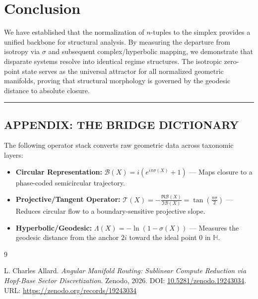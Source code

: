 \documentclass[12pt]{article}
\begin{document}
\section{Conclusion}
We have established that the normalization of $n$-tuples to the simplex provides a unified backbone for structural analysis. By measuring the departure from isotropy via $\sigma$ and subsequent complex/hyperbolic mapping, we demonstrate that disparate systems resolve into identical regime structures. The isotropic zero-point state serves as the universal attractor for all normalized geometric manifolds, proving that structural morphology is governed by the geodesic distance to absolute closure.

\vspace{1em}
\noindent\rule{\textwidth}{0.4pt}

\subsection*{APPENDIX: THE BRIDGE DICTIONARY}
The following operator stack converts raw geometric data across taxonomic layers:
\begin{itemize}
    \item \textbf{Circular Representation:} $\mathcal{B}(X) = i(e^{i\pi\sigma(X)} + 1)$ — Maps closure to a phase-coded semicircular trajectory.
    \item \textbf{Projective/Tangent Operator:} $\mathcal{T}(X) = -\frac{\Re \mathcal{B}(X)}{\Im \mathcal{B}(X)} = \tan(\frac{\pi\sigma}{2})$ — Reduces circular flow to a boundary-sensitive projective slope.
    \item \textbf{Hyperbolic/Geodesic:} $\Lambda(X) = -\ln(1 - \sigma(X))$ — Measures the geodesic distance from the anchor $2i$ toward the ideal point $0$ in $\mathbb{H}$.
\end{itemize}


\begin{thebibliography}{9}

L. Charles Allard.
\newblock \textit{Angular Manifold Routing: Sublinear Compute Reduction via Hopf-Base Sector Discretization}.
\newblock Zenodo, 2026.
\newblock DOI: \href{https://doi.org/10.5281/zenodo.19243034}{10.5281/zenodo.19243034}.
\newblock URL: \url{https://zenodo.org/records/19243034}

\end{thebibliography}
\end{document}
